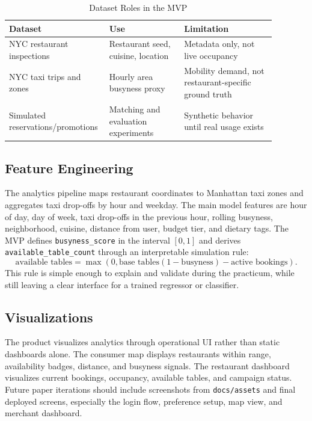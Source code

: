 \documentclass[conference]{IEEEtran}
\begin{document}
\begin{table}[htbp]
\caption{Dataset Roles in the MVP}
\centering
\begin{tabular}{p{0.28\linewidth}p{0.27\linewidth}p{0.33\linewidth}}
\toprule
\textbf{Dataset} & \textbf{Use} & \textbf{Limitation}\\
\midrule
NYC restaurant inspections & Restaurant seed, cuisine, location & Metadata only, not live occupancy\\
NYC taxi trips and zones & Hourly area busyness proxy & Mobility demand, not restaurant-specific ground truth\\
Simulated reservations/promotions & Matching and evaluation experiments & Synthetic behavior until real usage exists\\
\bottomrule
\end{tabular}
\label{tab:datasets}
\end{table}

\subsection{Feature Engineering}
The analytics pipeline maps restaurant coordinates to Manhattan taxi zones and aggregates taxi drop-offs by hour and weekday. The main model features are hour of day, day of week, taxi drop-offs in the previous hour, rolling busyness, neighborhood, cuisine, distance from user, budget tier, and dietary tags. The MVP defines \texttt{busyness\_score} in the interval $[0,1]$ and derives \texttt{available\_table\_count} through an interpretable simulation rule:
\[
\text{available tables} = \max(0, \text{base tables}(1 - \text{busyness}) - \text{active bookings}).
\]
This rule is simple enough to explain and validate during the practicum, while still leaving a clear interface for a trained regressor or classifier.

\subsection{Visualizations}
The product visualizes analytics through operational UI rather than static dashboards alone. The consumer map displays restaurants within range, availability badges, distance, and busyness signals. The restaurant dashboard visualizes current bookings, occupancy, available tables, and campaign status. Future paper iterations should include screenshots from \texttt{docs/assets} and final deployed screens, especially the login flow, preference setup, map view, and merchant dashboard.
\end{document}
